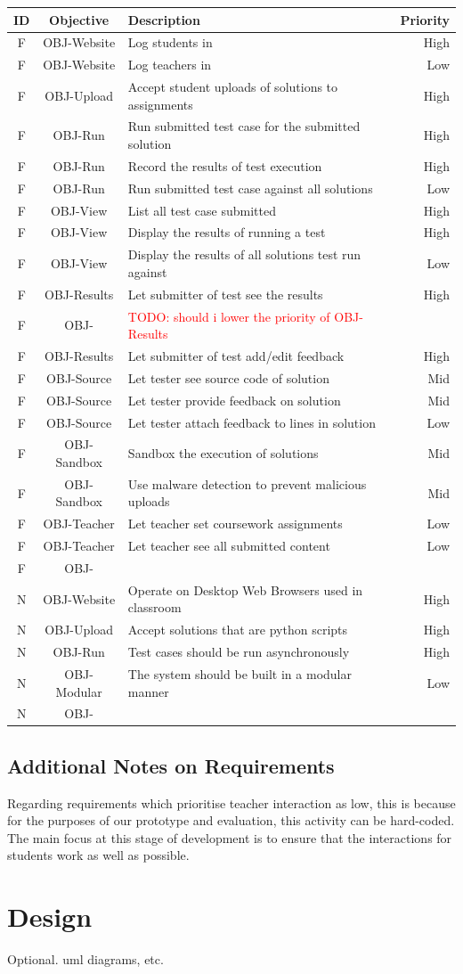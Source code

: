 \documentclass[a4paper,11pt]{report}
\newcommand{\todo}[1]{\textcolor{red}{TODO: #1}}
\newcounter{FunCount}
\newcounter{NFunCount}
\newcommand{\freq}[3]{\addtocounter{FunCount}{1}F\arabic{FunCount} & OBJ-#1 & #2 & #3\\}
\newcommand{\nfreq}[3]{\addtocounter{NFunCount}{1}N\arabic{NFunCount} & OBJ-#1 & #2 & #3\\}
\begin{document}
\begin{longtable}{cclr}
\textbf{ID} & \textbf{Objective} & \textbf{Description} & \textbf{Priority}\\\hline
\freq{Website}{Log students in}{High}
\freq{Website}{Log teachers in}{Low}
\freq{Upload}{Accept student uploads of solutions to assignments}{High}
\freq{Run}{Run submitted test case for the submitted solution}{High}
\freq{Run}{Record the results of test execution}{High}
\freq{Run}{Run submitted test case against all solutions}{Low}
\freq{View}{List all test case submitted}{High}
\freq{View}{Display the results of running a test}{High}
\freq{View}{Display the results of all solutions test run against}{Low}
\freq{Results}{Let submitter of test see the results}{High}
\freq{}{\todo{should i lower the priority of OBJ-Results}}{}
\freq{Results}{Let submitter of test add/edit feedback}{High}
\freq{Source}{Let tester see source code of solution}{Mid}
\freq{Source}{Let tester provide feedback on solution}{Mid}
\freq{Source}{Let tester attach feedback to lines in solution}{Low}
\freq{Sandbox}{Sandbox the execution of solutions}{Mid}
\freq{Sandbox}{Use malware detection to prevent malicious uploads}{Mid}
\freq{Teacher}{Let teacher set coursework assignments}{Low}
\freq{Teacher}{Let teacher see all submitted content}{Low}
\freq{}{}{}
\nfreq{Website}{Operate on Desktop Web Browsers used in classroom}{High}
\nfreq{Upload}{Accept solutions that are python scripts}{High}
\nfreq{Run}{Test cases should be run asynchronously}{High}
\nfreq{Modular}{The system should be built in a modular manner}{Low}
\nfreq{}{}{}
\end{longtable}

\subsection{Additional Notes on Requirements}
Regarding requirements which prioritise teacher interaction as low, this is because for the purposes of our prototype and evaluation, this activity can be hard-coded. The main focus at this stage of development is to ensure that the interactions for students work as well as possible.

\section{Design}
Optional. uml diagrams, etc.
\end{document}
